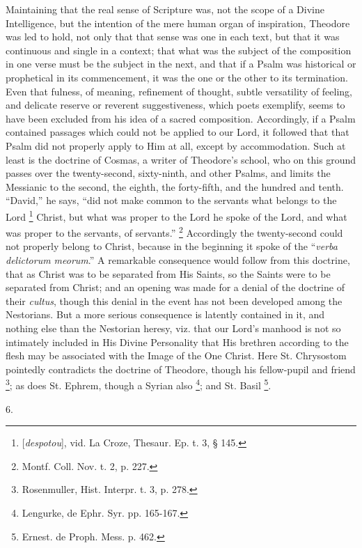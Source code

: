 Maintaining that the real sense of Scripture was, not the scope of
a Divine Intelligence, but the intention of the mere human organ of
inspiration, Theodore was led to hold, not only that that sense was
one in each text, but that it was continuous and single in a context;
that what was the subject of the composition in one verse must be the
subject in the next, and that if a Psalm was historical or prophetical
in its commencement, it was the one or the other to its termination.
Even that fulness, of meaning, refinement of thought, subtle
versatility of feeling, and delicate reserve or reverent
suggestiveness, which poets exemplify, seems to have been excluded
from his idea of a sacred composition. Accordingly, if a Psalm
contained passages which could not be applied to our Lord, it followed
that that Psalm did not properly apply to Him at all, except by
accommodation. Such at least is the doctrine of Cosmas, a writer of
Theodore's school, who on this ground passes over the twenty-second,
sixty-ninth, and other Psalms, and limits the Messianic to the second,
the eighth, the forty-fifth, and the hundred and tenth.
``David,'' he says, ``did not make common to the servants
what belongs to the Lord \footnote{[\emph{despotou}],
vid. La Croze, Thesaur. Ep. t. 3, § 145.}
Christ, but what was proper to the Lord he spoke of the Lord, and what
was proper to the servants, of servants.'' \footnote{Montf. Coll. Nov. t. 2, p. 227.} Accordingly the twenty-second could not properly belong to
Christ, because in the beginning it spoke of the ``\emph{verba
delictorum meorum}.'' A remarkable consequence would follow
from this doctrine, that as Christ was to be separated from His
Saints, so the Saints were to be separated from Christ; and an opening
was made for a denial of the doctrine of their \emph{cultus}, though
this denial in the event has not been developed among the Nestorians.
But a more serious consequence is latently contained in it, and
nothing else than the Nestorian heresy, viz. that our Lord's manhood
is not so intimately included in His Divine Personality that His
brethren according to the flesh may be associated with the Image of
the One Christ. Here St. Chrysostom pointedly contradicts the doctrine
of Theodore, though his fellow-pupil and friend \footnote{Rosenmuller, Hist. Interpr. t. 3, p. 278.}; as does St. Ephrem, though a Syrian also \footnote{Lengurke, de Ephr. Syr. pp. 165-167.}; and St. Basil \footnote{Ernest. de Proph. Mess. p. 462.}.

6.

